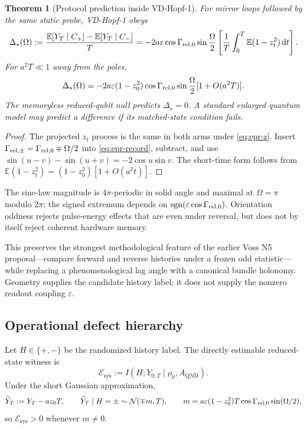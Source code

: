 \documentclass[10pt]{article}
\newtheorem{theorem}{Theorem}[section]
\theoremstyle{definition}
\theoremstyle{remark}
\newcommand{\E}{\mathbb E}
\newcommand{\dd}{\mathrm d}
\newcommand{\cE}{\mathcal E}
\begin{document}
\begin{theorem}[Protocol prediction inside VD-Hopf-1]
\label{thm:target}
For mirror loops followed by the same static probe, VD-Hopf-1 obeys
\begin{equation}
  \Delta_\star(\Omega)
  :=
  \frac{\E[Y_T\mid C_+]-\E[Y_T\mid C_-]}{T}
  =
  -2a\varepsilon
  \cos\Gamma_{{\rm rel},0}
  \sin\frac{\Omega}{2}
  \left[
  \frac1T\int_0^T\E(1-z_t^2)\,\dd t
  \right].
  \label{eq:frozen-sine}
\end{equation}
For \(a^2T\ll1\) away from the poles,
\begin{equation}
  \Delta_\star(\Omega)
  =
  -2a\varepsilon(1-z_0^2)
  \cos\Gamma_{{\rm rel},0}
  \sin\frac{\Omega}{2}
  [1+O(a^2T)].
  \label{eq:short-frozen-sine}
\end{equation}
The memoryless reduced-qubit null predicts \(\Delta_\star=0\). A standard enlarged quantum model may predict a difference if its matched-state condition fails.
\end{theorem}

\begin{proof}
The projected \(z_t\) process is the same in both arms under \cref{eq:epr-z}. Insert
\(\Gamma_{{\rm rel},\pm}=\Gamma_{{\rm rel},0}\mp\Omega/2\)
into \cref{eq:epr-record}, subtract, and use
\(\sin(u-v)-\sin(u+v)=-2\cos u\sin v\).
The short-time form follows from
\(\E(1-z_t^2)=(1-z_0^2)[1+O(a^2t)]\).
\end{proof}

The sine-law magnitude is \(4\pi\)-periodic in solid angle and maximal at \(\Omega=\pi\) modulo \(2\pi\); the signed extremum depends on \(\operatorname{sgn}(\varepsilon\cos\Gamma_{{\rm rel},0})\). Orientation oddness rejects pulse-energy effects that are even under reversal, but does not by itself reject coherent hardware memory.

This preserves the strongest methodological feature of the earlier Voss N5 proposal---compare forward and reverse histories under a frozen odd statistic---while replacing a phenomenological lag angle with a canonical bundle holonomy. Geometry supplies the candidate history label; it does not supply the nonzero readout coupling \(\varepsilon\).

\subsection{Operational defect hierarchy}

Let \(H\in\{+,-\}\) be the randomized history label. The directly estimable reduced-state witness is
\begin{equation}
  \cE_{\mathrm{sys}}
  :=
  I(H;Y_{0:T}\mid \rho_0,A_{\mathrm{QND}}).
  \label{eq:system-defect}
\end{equation}
Under the short Gaussian approximation,
\[
\widetilde Y_T
:=
Y_T-a z_0T,
\qquad
\widetilde Y_T\mid H=\pm
\sim
\mathcal N(\mp m,T),
\qquad
m=a\varepsilon(1-z_0^2)T
\cos\Gamma_{{\rm rel},0}\sin(\Omega/2),
\]
so \(\cE_{\mathrm{sys}}>0\) whenever \(m\neq0\).
\end{document}
